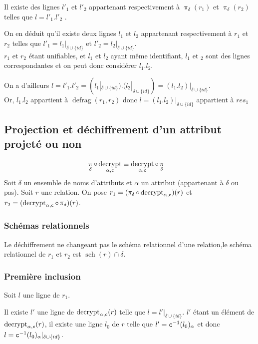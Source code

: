 \documentclass[french]{article}
\DeclareMathOperator{\proj}{\pi}
\DeclareMathOperator{\defrag}{defrag}
\DeclareMathOperator{\decrypt}{decrypt}
\DeclareMathOperator{\s}{sch}
\newcommand\typeT[1]{\text{\ttfamily #1}}
\newcommand{\decryptArgs}[2]{\decrypt_{#1 , \typeT{#2}}}
\newcommand{\projDelta}{\proj_{\delta}}
\newcommand{\decryptCAlpha}{\decryptArgs{\alpha}{c}}
\newcommand{\dc}[1]{\typeT{c}^{-1}(#1)}
\newcommand{\cip}{\cup \{id\}}
\newcommand{\intro}[2]{Soit $r$ une relation. On pose $r_1 = (#1)(r) $ et $r_2 = (#2)(r) $}
\begin{document}
Il existe des lignes $l'_1$ et $l'_2$
appartenant respectivement à $\projDelta(r_1)$ et $\projDelta(r_2)$
telles que $l = l'_1 . l'_2$
.

On en déduit qu'il existe deux lignes $l_1$ et $l_2$
appartenant respectivement à $r_1$ et $r_2$ 
telles que $l'_1 = l_1|_{\delta \cip}$ et $l'_2 = l_2|_{\delta \cip}$. \\

$r_1$ et $r_2$ étant unifiables, et $l_1$ et $l_2$ ayant même identifiant,
$l_1$ et $_2$ sont des lignes correspondantes et on peut donc considérer
$l_1 . l_2$.

On a d'ailleurs 
$l = l'_1 . l'_2 = (l_1|_{\delta \cip}) . (l_2|_{\delta \cip}) = (l_1 . l_2)|_{\delta \cip}$. \\

Or, $l_1 . l_2$ appartient à $\defrag(r_1, r_2)$
donc $l = (l_1 . l_2)|_{\delta \cip}$ appartient à $ {res}_1$

\subsection*{Projection et déchiffrement d'un attribut projeté ou non}
\begin{align}
\projDelta \circ \decryptArgs{\alpha}{c}
& \equiv \decryptArgs{\alpha}{c} \circ \projDelta
\end{align}
Soit $\delta$ un ensemble de noms d'attributs
et $\alpha$ un attribut (appartenant à $\delta$ ou pas).
\intro{\projDelta \circ \decryptArgs{\alpha}{c}}{\decryptArgs{\alpha}{c} \circ \projDelta}.

\subsubsection*{Schémas relationnels}
Le déchiffrement ne changeant pas le schéma relationnel
d'une relation,le schéma relationnel de $r_1$ et $r_2$
est $\s(r) \cap \delta$.

\subsubsection*{Première inclusion}
Soit $l$ une ligne de $r_1$.

Il existe $l'$ une ligne de $\decryptCAlpha(r)$ telle que
$l = l'|_{\delta \cip}$.
$l'$ étant un élément de $\decryptCAlpha(r)$, il existe une ligne
$l_0$ de $r$ telle que $l' = \dc{l_0}_\alpha$
et donc $l = \dc{l_0}_\alpha|_{\delta \cip}$. \\
\end{document}
